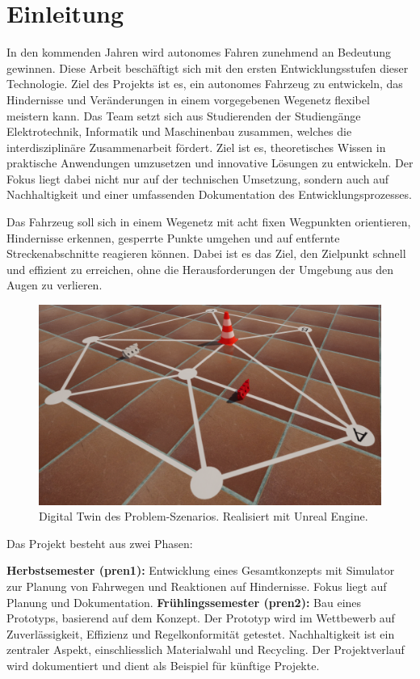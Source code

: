 \documentclass[../main.tex]{subfiles}
\begin{document}
\newpage
\section{Einleitung}

In den kommenden Jahren wird autonomes Fahren zunehmend an Bedeutung gewinnen. Diese Arbeit beschäftigt sich mit den ersten Entwicklungsstufen dieser Technologie. Ziel des Projekts ist es, ein autonomes Fahrzeug zu entwickeln, das Hindernisse und Veränderungen in einem vorgegebenen Wegenetz flexibel meistern kann. Das Team setzt sich aus Studierenden der Studiengänge Elektrotechnik, Informatik und Maschinenbau zusammen, welches die interdisziplinäre Zusammenarbeit fördert. Ziel ist es, theoretisches Wissen in praktische Anwendungen umzusetzen und innovative Lösungen zu entwickeln. Der Fokus liegt dabei nicht nur auf der technischen Umsetzung, sondern auch auf Nachhaltigkeit und einer umfassenden Dokumentation des Entwicklungsprozesses.

Das Fahrzeug soll sich in einem Wegenetz mit acht fixen Wegpunkten orientieren, Hindernisse erkennen, gesperrte Punkte umgehen und auf entfernte Streckenabschnitte reagieren können. Dabei ist es das Ziel, den Zielpunkt schnell und effizient zu erreichen, ohne die Herausforderungen der Umgebung aus den Augen zu verlieren.
\begin{figure}[H]
    \centering
    \includegraphics[width=0.75\linewidth]{img/unrealengine/unreal.png}
    \caption{Digital Twin des Problem-Szenarios. Realisiert mit Unreal Engine\protect\footnotemark.}
    \label{intro_digital_twin}
\end{figure}
Das Projekt besteht aus zwei Phasen:

\textbf{Herbstsemester (\acrshort{pren1}):} Entwicklung eines Gesamtkonzepts mit Simulator zur Planung von Fahrwegen und Reaktionen auf Hindernisse. Fokus liegt auf Planung und Dokumentation.
\textbf{Frühlingssemester (\acrshort{pren2}):} Bau eines Prototyps, basierend auf dem Konzept. Der Prototyp wird im Wettbewerb auf Zuverlässigkeit, Effizienz und Regelkonformität getestet.
Nachhaltigkeit ist ein zentraler Aspekt, einschliesslich Materialwahl und Recycling. Der Projektverlauf wird dokumentiert und dient als Beispiel für künftige Projekte.
\end{document}
